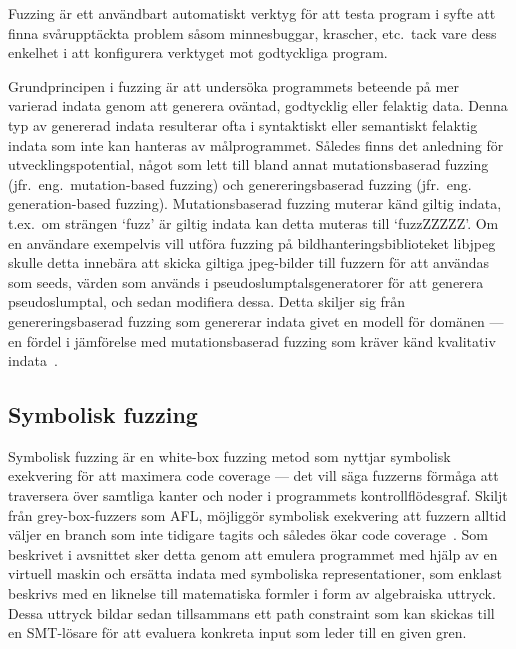 Fuzzing är ett användbart automatiskt verktyg för att testa program i syfte att finna
svårupptäckta problem såsom minnesbuggar, krascher, etc.\ tack vare dess enkelhet i
att konfigurera verktyget mot godtyckliga program.

Grundprincipen i fuzzing är att undersöka programmets beteende på mer varierad
indata genom att generera oväntad, godtycklig eller felaktig data. Denna typ av
genererad indata resulterar ofta i syntaktiskt eller semantiskt felaktig indata
som inte kan hanteras av målprogrammet. Således finns det anledning för
utvecklingspotential, något som lett till bland annat mutationsbaserad fuzzing
(jfr.\ eng.\ mutation-based fuzzing) och genereringsbaserad fuzzing (jfr.\ eng.
generation-based fuzzing). Mutationsbaserad fuzzing muterar känd giltig indata,
t.ex.\ om strängen `fuzz' är giltig indata kan detta muteras till `fuzzZZZZZ'. Om
en användare exempelvis vill utföra fuzzing på bildhanteringsbiblioteket libjpeg skulle
detta innebära att skicka giltiga jpeg-bilder till fuzzern för att användas som
seeds, värden som används i pseudoslumptalsgeneratorer för att generera
pseudoslumptal, och sedan modifiera dessa. Detta skiljer sig från
genereringsbaserad fuzzing som genererar indata givet en modell för domänen ---
en fördel i jämförelse med mutationsbaserad fuzzing som kräver känd kvalitativ
indata~\cite{fuzzing}.

\subsection{Symbolisk fuzzing} Symbolisk fuzzing är en white-box fuzzing metod
som nyttjar symbolisk exekvering för att maximera code coverage --- det vill säga fuzzerns
förmåga att traversera över samtliga kanter och noder i programmets kontrollflödesgraf.
Skiljt från grey-box-fuzzers som AFL, möjliggör symbolisk exekvering att fuzzern alltid
väljer en branch som inte tidigare tagits och således ökar code coverage~\cite{challenges_fuzzing}.
Som beskrivet i avsnittet  sker detta genom att
emulera programmet med hjälp av en virtuell maskin och ersätta indata med symboliska representationer,
som enklast beskrivs med en liknelse till matematiska formler i form av algebraiska uttryck.
Dessa uttryck bildar sedan tillsammans ett path constraint som kan skickas till en SMT-lösare för
att evaluera konkreta input som leder till en given gren.

